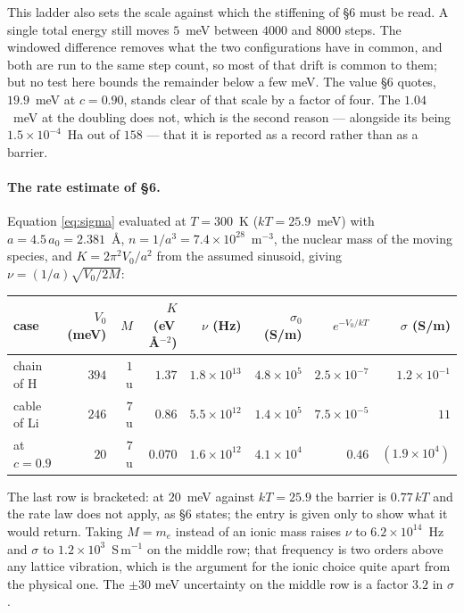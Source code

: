 \documentclass[11pt]{article}
\begin{document}
This ladder also sets the scale against which the stiffening of \S6 must be read. A single total
energy still moves $5$~meV between $4000$ and $8000$ steps. The windowed difference removes what the
two configurations have in common, and both are run to the same step count, so most of that drift is
common to them; but no test here bounds the remainder below a few meV. The value \S6 quotes,
$19.9$~meV at $c=0.90$, stands clear of that scale by a factor of four. The $1.04$~meV at the
doubling does not, which is the second reason --- alongside its being $1.5\times10^{-4}$~Ha out of
$158$ --- that it is reported as a record rather than as a barrier.

\paragraph{The rate estimate of \S6.} Equation \eqref{eq:sigma} evaluated at $T=300$~K
($kT=25.9$~meV) with $a=4.5\,a_0=2.381$~\AA, $n=1/a^3=7.4\times10^{28}$~m$^{-3}$, the nuclear mass of the moving species, and
$K=2\pi^2V_0/a^2$ from the assumed sinusoid, giving $\nu=(1/a)\sqrt{V_0/2M}$:
\begin{center}
\small
\begin{tabular}{@{}lrrrrrrr@{}}
\toprule
case & $V_0$ (meV) & $M$ & $K$ (eV\,\AA$^{-2}$) & $\nu$ (Hz) & $\sigma_0$ (S/m) & $e^{-V_0/kT}$ & $\sigma$ (S/m)\\
\midrule
chain of H & $394$ & $1$~u & $1.37$ & $1.8\times10^{13}$ & $4.8\times10^{5}$ & $2.5\times10^{-7}$ & $1.2\times10^{-1}$\\
cable of Li & $246$ & $7$~u & $0.86$ & $5.5\times10^{12}$ & $1.4\times10^{5}$ & $7.5\times10^{-5}$ & $11$\\
\quad at $c=0.9$ & $20$ & $7$~u & $0.070$ & $1.6\times10^{12}$ & $4.1\times10^{4}$ & $0.46$ & $(1.9\times10^{4})$\\
\bottomrule
\end{tabular}
\end{center}
\noindent The last row is bracketed: at $20$~meV against $kT=25.9$ the barrier is $0.77\,kT$ and
the rate law does not apply, as \S6 states; the entry is given only to show what it would return.
Taking $M=m_e$ instead of an ionic mass raises $\nu$ to $6.2\times10^{14}$~Hz and $\sigma$
to $1.2\times10^{3}$~S\,m$^{-1}$ on the middle row; that frequency is two orders above any lattice
vibration, which is the argument for the ionic choice quite apart from the physical one. The $\pm30$
meV uncertainty on the middle row is a factor $3.2$ in $\sigma$.
\end{document}
